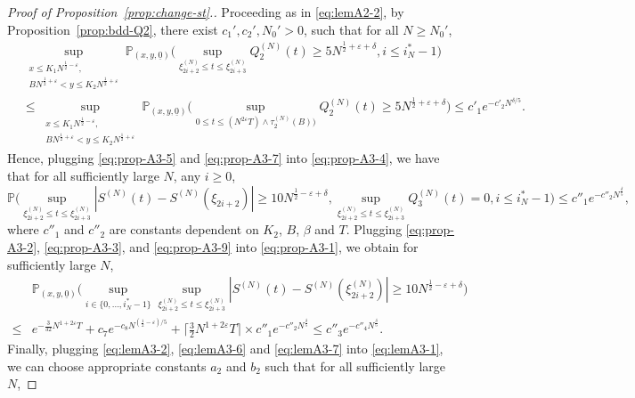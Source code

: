 \documentclass[11pt, reqno]{article}
\numberwithin{equation}{section}
\numberwithin{theorem}{section}
\begin{document}
\begin{appendix}
\begin{proof}[Proof of Proposition~\ref{prop:change-st}.]
Proceeding as in \eqref{eq:lemA2-2}, by Proposition~\ref{prop:bdd-Q2}, there exist $c_1', c_2', N_0'>0$, such that for all $N\geq N_0'$,
\begin{equation}\label{eq:prop-A3-7}
\begin{split}
    &\sup_{\substack{x\leq K_1N^{\frac{1}{2} - \varepsilon},\\ BN^{\frac{1}{2} + \varepsilon} <y\leq K_2N^{\frac{1}{2} + \varepsilon}}}\mathbb{P}_{(x,y, \underline{0})}\Big(\sup_{\xi^{(N)}_{2i+2}\leq t\leq \xi^{(N)}_{2i+3}}Q^{(N)}_2(t)\geq 5 N^{\frac{1}{2}+\varepsilon+\delta}, i\leq i^*_N-1\Big)\\
     &\leq \sup_{\substack{x\leq K_1N^{\frac{1}{2} - \varepsilon},\\ BN^{\frac{1}{2} + \varepsilon} <y\leq K_2N^{\frac{1}{2} + \varepsilon}}}\mathbb{P}_{(x,y, \underline{0})}\Big(\sup_{0\leq t\leq (N^{2\varepsilon}T)\wedge \tau^{(N)}_2(B))}Q^{(N)}_2(t)\geq 5 N^{\frac{1}{2}+\varepsilon+\delta}\Big)\leq c'_1e^{-c'_2N^{\delta/5}}.
\end{split}
\end{equation} 
Hence, plugging \eqref{eq:prop-A3-5} and \eqref{eq:prop-A3-7} into \eqref{eq:prop-A3-4}, we have that for all sufficiently large $N$, any $i \ge 0$,
\begin{equation}\label{eq:prop-A3-9}
    \mathbb{P}\Big(\sup_{\xi^{(N)}_{2i+2}\leq t\leq \xi^{(N)}_{2i+3}}\left|S^{(N)}(t)-S^{(N)}(\xi_{2i+2})\right|\geq 10 N^{\frac{1}{2}-\varepsilon+\delta}, \sup_{\xi^{(N)}_{2i+2}\leq t\leq \xi^{(N)}_{2i+3}}Q^{(N)}_3(t)=0, i\leq i^*_N-1\Big)\leq c''_1e^{-c''_2N^{\frac{\delta}{5}}},
\end{equation}
where $c''_1$ and $c''_2$ are constants dependent on $K_2$, $B$, $\beta$ and $T$.
Plugging \eqref{eq:prop-A3-2}, \eqref{eq:prop-A3-3}, and \eqref{eq:prop-A3-9} into \eqref{eq:prop-A3-1}, we obtain for sufficiently large $N$,
\begin{align}\label{eq:lemA3-7}
    &\mathbb{P}_{(x,y, \underline{0})}\Big(\sup_{i\in \{0,...,i^*_N-1\}}\sup_{\xi^{(N)}_{2i+2}\leq t\leq \xi^{(N)}_{2i+3}}\left|S^{(N)}(t)-S^{(N)}(\xi^{(N)}_{2i+2})\right|\geq 10 N^{\frac{1}{2}-\varepsilon+\delta} \Big)\nonumber\\
    \leq & e^{-\frac{3}{32}N^{1+2\varepsilon}T}+c_7e^{-c_8N^{(\frac{1}{2}-\varepsilon)/5}}+\Big\lceil\frac{3}{2}N^{1+2\varepsilon}T\Big\rceil\times c''_1e^{-c''_2N^{\frac{\delta}{5}}}\leq c''_3 e^{-c''_4 N^{\frac{\delta}{5}}}.
\end{align}
Finally, plugging \eqref{eq:lemA3-2}, \eqref{eq:lemA3-6} and \eqref{eq:lemA3-7} into \eqref{eq:lemA3-1}, we can choose appropriate constants $a_2$ and $b_2$ such that for all sufficiently large $N$,

\end{proof}
\end{appendix}
\end{document}
